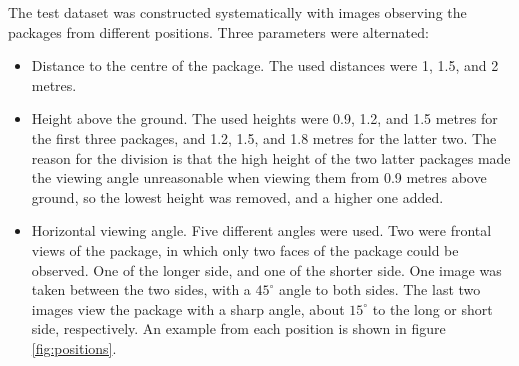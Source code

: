 The test dataset was constructed systematically with images observing the packages from different positions.
Three parameters were alternated: 
\begin{itemize}
	\item Distance to the centre of the package. 
			The used distances were 1, 1.5, and 2 metres.
	\item Height above the ground. 
			The used heights were 0.9, 1.2, and 1.5 metres for the first three packages, and 1.2, 1.5, and 1.8 metres for the latter two.
			The reason for the division is that the high height of the two latter packages made the viewing angle unreasonable when viewing them from 0.9 metres above ground, so the lowest height was removed, and a higher one added.
	\item Horizontal viewing angle. 
			Five different angles were used.
			Two were frontal views of the package, in which only two faces of the package could be observed. One of the longer side, and one of the shorter side.
			One image was taken between the two sides, with a $45^\circ$ angle to both sides.
			The last two images view the package with a sharp angle, about $15^\circ$ to the long or short side, respectively.
			An example from each position is shown in figure \ref{fig:positions}.
\end{itemize}

